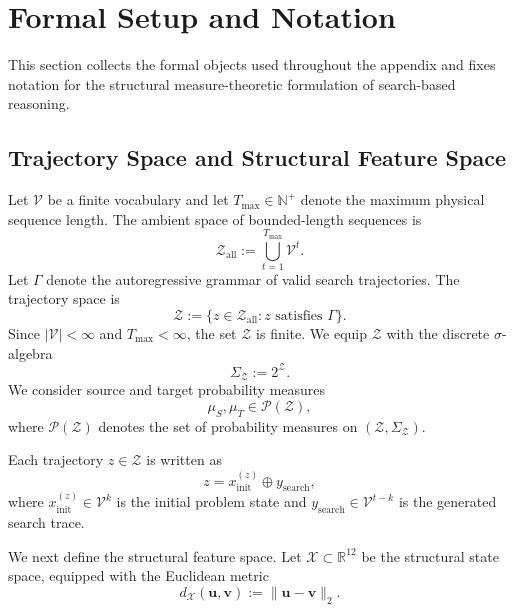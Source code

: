 \section{Formal Setup and Notation}
\label{app:setup}

This section collects the formal objects used throughout the appendix and fixes notation for the structural measure-theoretic formulation of search-based reasoning.

\subsection{Trajectory Space and Structural Feature Space}
\label{app:trajectory-space}

Let $\mathcal{V}$ be a finite vocabulary and let $T_{\max}\in\mathbb{N}^+$ denote the maximum physical sequence length. The ambient space of bounded-length sequences is
\begin{equation}
\mathcal{Z}_{\mathrm{all}} := \bigcup_{t=1}^{T_{\max}} \mathcal{V}^{t}.
\end{equation}
Let $\Gamma$ denote the autoregressive grammar of valid search trajectories. The trajectory space is
\begin{equation}
\mathcal{Z} := \{ z \in \mathcal{Z}_{\mathrm{all}} : z \text{ satisfies } \Gamma \}.
\end{equation}
Since $|\mathcal{V}| < \infty$ and $T_{\max} < \infty$, the set $\mathcal{Z}$ is finite. We equip $\mathcal{Z}$ with the discrete $\sigma$-algebra
\begin{equation}
\Sigma_{\mathcal{Z}} := 2^{\mathcal{Z}}.
\end{equation}
We consider source and target probability measures
\begin{equation}
\mu_S, \mu_T \in \mathcal{P}(\mathcal{Z}),
\end{equation}
where $\mathcal{P}(\mathcal{Z})$ denotes the set of probability measures on $(\mathcal{Z}, \Sigma_{\mathcal{Z}})$.

Each trajectory $z\in\mathcal Z$ is written as
\begin{equation}
z = x_{\mathrm{init}}^{(z)} \oplus y_{\mathrm{search}},
\end{equation}
where $x_{\mathrm{init}}^{(z)}\in\mathcal V^k$ is the initial problem state and $y_{\mathrm{search}}\in\mathcal V^{t-k}$ is the generated search trace.

We next define the structural feature space. Let $\mathcal{X} \subset \mathbb{R}^{12}$ be the structural state space, equipped with the Euclidean metric
\begin{equation}
d_{\mathcal{X}}(\mathbf{u}, \mathbf{v}) := \|\mathbf{u} - \mathbf{v}\|_2.
\end{equation}

